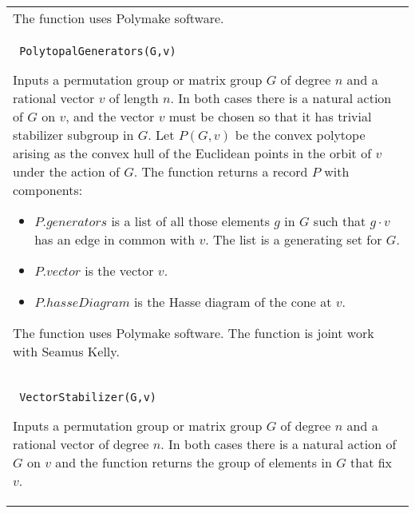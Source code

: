 \documentclass[a4paper,11pt]{report}
\begin{document}
{\begin{center}
\begin{tabular}{|l|}
 The function uses Polymake software. \\
 \index{PolytopalGenerators} \texttt{ PolytopalGenerators(G,v) } 

 Inputs a permutation group or matrix group $G$ of degree $n$ and a rational vector $v$ of length $n$. In both cases there is a natural action of $G$ on $v$, and the vector $v$ must be chosen so that it has trivial stabilizer subgroup in $G$. Let $P(G,v)$ be the convex polytope arising as the convex hull of the Euclidean points in
the orbit of $v$ under the action of $G$. The function returns a record $P$ with components: 
\begin{itemize}
\item  $P.generators$ is a list of all those elements $g$ in $G$ such that $g\cdot v$ has an edge in common with $v$. The list is a generating set for $G$.
\item  $P.vector$ is the vector $v$.
\item $P.hasseDiagram$ is the Hasse diagram of the cone at $v$. 
\end{itemize}
 The function uses Polymake software. The function is joint work with Seamus
Kelly. \\
 \index{VectorStabilizer} \texttt{ VectorStabilizer(G,v) } 

 Inputs a permutation group or matrix group $G$ of degree $n$ and a rational vector of degree $n$. In both cases there is a natural action of $G$ on $v$ and the function returns the group of elements in $G$ that fix $v$. \\
\end{tabular}\\[2mm]
\end{center}

 }

 
\end{document}
